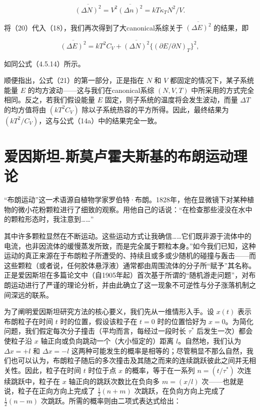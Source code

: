 \begin{equation}\tag{15.1.22}\label{eq:15.1.22}
\overline { { ( \Delta N ) ^{2} } } = V ^{2} \overline { { ( \Delta n ) ^{2} } } = k T \kappa _ { T } N ^{2} / V .
\end{equation}

将（20）代入（18），我们再次得到了大canonical系综关于 \(\overline{(\Delta E)^2}\) 的结果，即

\begin{equation}\tag{15.1.23}\label{eq:15.1.23}
\overline { { ( \Delta E ) ^{2} } } = k T ^{2} C _ { V } + \overline { { ( \Delta N ) ^{2} } } \{ ( \partial E / \partial N ) _ { T } \} ^{2} ,
\end{equation}

如同公式（4.5.14）所示。

顺便指出，公式（21）的第一部分，正是指在 \(N\) 和 \(V\) 都固定的情况下，某子系统能量 \(E\) 的均方波动------这与我们在canonical系综 \((N,V,T)\) 中所采用的方式完全相同。反之，若我们假设能量 \(E\) 固定，则子系统的温度将会发生波动，而量 \(\Delta T\) 的均方值将由 \((kT^2C_V)\) 除以子系统热容的平方所得。因此，最终结果为 \((kT^2/C_V)\)，这与公式（14a）中的结果完全一致。

\section{爱因斯坦-斯莫卢霍夫斯基的布朗运动理论}\label{ux7231ux56e0ux65afux5766-ux65afux83abux5362ux970dux592bux65afux57faux7684ux5e03ux6717ux8fd0ux52a8ux7406ux8bba}

``布朗运动''这一术语源自植物学家罗伯特·布朗。1828年，他在显微镜下对某种植物的微小花粉颗粒进行了细致的观察。用他自己的话说：``在检查那些浸没在水中的颗粒形态时，我注意到\ldots\ldots{}''

其中许多颗粒显然在不断运动。这些运动方式让我确信\ldots\ldots 它们既非源于流体中的电流，也非因流体的缓慢蒸发所致，而是完全属于颗粒本身。''如今我们已知，这种运动的真正来源在于布朗粒子所遭受的、持续且或多或少随机的碰撞与轰击------而这些颗粒（或者说，任何胶体悬浮液）通常都由周围流体的分子所``赋予''其名称。正是爱因斯坦在多篇论文中（自1905年起）首次基于所谓的``随机游走问题''，对布朗运动进行了严谨的理论分析，并由此确立了这一现象不可逆性与分子涨落机制之间深远的联系。

为了阐明爱因斯坦研究方法的核心要义，我们先从一维情形入手。设 \(x(t)\) 表示布朗粒子在时间 \(t\) 时的位置，假设该粒子在 \(t=0\) 时的位置恰好为 \(x=0\)。为简化问题，我们假定每次分子撞击（平均而言，每经过一段时长 \(\tau^{*}\) 后发生一次）都会使粒子沿 \(x\) 轴正向或负向跳动一个（大小恒定的）距离 \(l\)。自然地，我们认为 \(\Delta x=+l\) 和 \(\Delta x=-l\) 这两种可能发生的概率是相等的；尽管稍显不那么自然，我们也可以认为，布朗粒子随后的多次撞击及其随之而来的连续跳跃彼此之间并无相关性。因此，粒子在时间 \(t\) 时位于点 \(x\) 的概率，等于在一系列 \(n=(t/\tau^{*})\) 次连续跳跃中，粒子在 \(x\) 轴正向的跳跃次数比在负向多 \(m=(x/l)\) 次------也就是说，粒子在正向方向上完成了 \(\frac{1}{2}(n+m)\) 次跳跃，在负向方向上完成了 \(\frac{1}{2}(n-m)\) 次跳跃。所需的概率则由二项式表达式给出：

